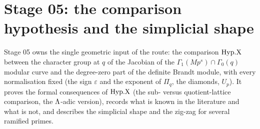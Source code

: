 \providecommand{\BG}{\mathrm{BG}}
\providecommand{\Tpath}[1]{\texttt{#1}}
\providecommand{\cH}{\mathcal{H}}
\providecommand{\Xq}{X_q}
\providecommand{\Ros}{\mathsf{Ros}}
\providecommand{\Frob}{\mathrm{Frob}}
\section*{Stage 05: the comparison hypothesis and the simplicial shape}\label{sec:stage-05}

Stage 05 owns the single geometric input of the route: the comparison $\mathrm{Hyp.X}$ between the character group at $q$ of the
Jacobian of the $\Gamma_1(Mp^s)\cap\Gamma_0(q)$ modular curve and the degree-zero part of the definite Brandt module, with
every normalisation fixed (the sign $\varepsilon$ and the exponent of $\Pi_q$, the diamonds, $U_p$). It proves the formal
consequences of $\mathrm{Hyp.X}$ (the sub- versus quotient-lattice comparison, the $\Lambda$-adic version), records what is known in
the literature and what is not, and describes the simplicial shape and the zig-zag for several ramified primes.

